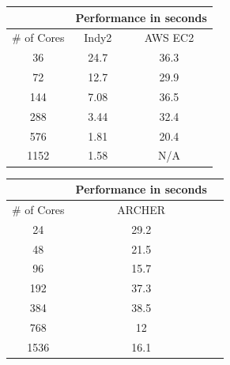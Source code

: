 \begin{center}

\label{table:perf}

\begin{tabular}{|c|c|c|}
\hline
\multicolumn{1}{|l|}{}            & \multicolumn{2}{c|}{Performance in seconds}               \\ \hline
\multicolumn{1}{|c|}{\# of Cores} & \multicolumn{1}{c|}{Indy2} & \multicolumn{1}{c|}{AWS EC2} \\ \hline
36                                & 24.7                       & 36.3                         \\ \hline
72                                & 12.7                       & 29.9                         \\ \hline
144                               & 7.08                       & 36.5                         \\ \hline
288                               & 3.44                       & 32.4                         \\ \hline
576                               & 1.81                       & 20.4                         \\ \hline
1152                              & 1.58                       & N/A                             \\ \hline
\end{tabular}

\end{center}



\vspace{1cm}

\begin{center}
\label{table:perf-archer}
\begin{tabular}{|c|c|c|}
\hline
\multicolumn{1}{|l|}{}            & \multicolumn{1}{c|}{Performance in seconds}               \\ \hline
\multicolumn{1}{|l|}{\# of Cores} & \multicolumn{1}{c|}{ARCHER}  \\ \hline
24                                & 29.2                                           \\ \hline
48                                & 21.5                                         \\ \hline
96                               & 15.7                                       \\ \hline
192                               & 37.3                                           \\ \hline
384                               & 38.5                                               \\ \hline
768                              & 12                                              \\ \hline
1536                              & 16.1                                              \\ \hline
\end{tabular}
\end{center}


